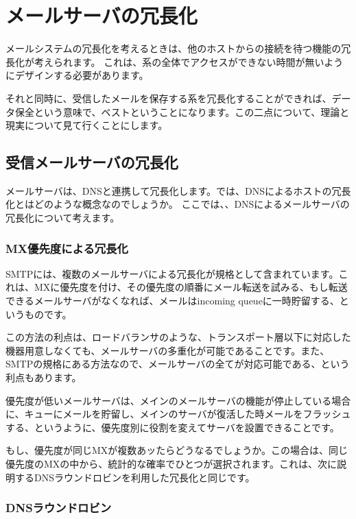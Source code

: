 \chapter{メールサーバの冗長化}

メールシステムの冗長化を考えるときは、他のホストからの接続を待つ機能の冗長化が考えられます。
これは、系の全体でアクセスができない時間が無いようにデザインする必要があります。

それと同時に、受信したメールを保存する系を冗長化することができれば、データ保全という意味で、ベストということになります。この二点について、理論と現実について見て行くことにします。


\section{受信メールサーバの冗長化}

メールサーバは、DNSと連携して冗長化します。では、DNSによるホストの冗長化とはどのような概念なのでしょうか。
ここでは、、DNSによるメールサーバの冗長化について考えます。



\subsection{MX優先度による冗長化}

SMTPには、複数のメールサーバによる冗長化が規格として含まれています。これは、MXに優先度を付け、その優先度の順番にメール転送を試みる、もし転送できるメールサーバがなくなれば、メールはincoming queueに一時貯留する、というものです。

この方法の利点は、ロードバランサのような、トランスポート層以下に対応した機器用意しなくても、メールサーバの多重化が可能であることです。また、SMTPの規格にある方法なので、メールサーバの全てが対応可能である、という利点もあります。

優先度が低いメールサーバは、メインのメールサーバの機能が停止している場合に、キューにメールを貯留し、メインのサーバが復活した時メールをフラッシュする、というように、優先度別に役割を変えてサーバを設置できることです。

もし、優先度が同じMXが複数あッたらどうなるでしょうか。この場合は、同じ優先度のMXの中から、統計的な確率でひとつが選択されます。これは、次に説明するDNSラウンドロビンを利用した冗長化と同じです。

\subsection{DNSラウンドロビン}

